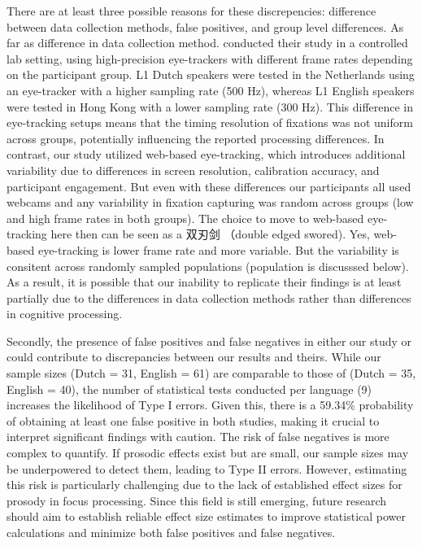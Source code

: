 There are at least three possible reasons for these discrepencies: difference between data collection methods, false positives, and group level differences. As far as difference in data collection method. \citep{Ge2021} conducted their study in a controlled lab setting, using high-precision eye-trackers with different frame rates depending on the participant group. L1 Dutch speakers were tested in the Netherlands using an eye-tracker with a higher sampling rate (500 Hz), whereas L1 English speakers were tested in Hong Kong with a lower sampling rate (300 Hz). This difference in eye-tracking setups means that the timing resolution of fixations was not uniform across groups, potentially influencing the reported processing differences. In contrast, our study utilized web-based eye-tracking, which introduces additional variability due to differences in screen resolution, calibration accuracy, and participant engagement. But even with these differences our participants all used webcams and any variability in fixation capturing was random across groups (low and high frame rates in both groups). The choice to move to web-based eye-tracking here then can be seen as a 双刃剑 （double edged swored). Yes, web-based eye-tracking is lower frame rate and more variable. But the variability is consitent across randomly sampled populations (population is discusssed below). As a result, it is possible that our inability to replicate their findings is at least partially due to the differences in data collection methods rather than differences in cognitive processing.

Secondly, the presence of false positives and false negatives in either our study or \citep{Ge2021} could contribute to discrepancies between our results and theirs. While our sample sizes (Dutch = 31, English = 61) are comparable to those of \citep{Ge2021} (Dutch = 35, English = 40), the number of statistical tests conducted per language (9) increases the likelihood of Type I errors. Given this, there is a 59.34\% probability of obtaining at least one false positive in both studies, making it crucial to interpret significant findings with caution. The risk of false negatives is more complex to quantify. If prosodic effects exist but are small, our sample sizes may be underpowered to detect them, leading to Type II errors. However, estimating this risk is particularly challenging due to the lack of established effect sizes for prosody in focus processing. Since this field is still emerging, future research should aim to establish reliable effect size estimates to improve statistical power calculations and minimize both false positives and false negatives.

